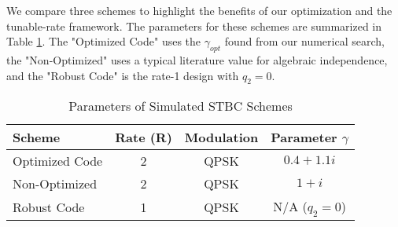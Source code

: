 \documentclass[twocolumn,conference]{IEEEtran}
\begin{document}
We compare three schemes to highlight the benefits of our optimization and the tunable-rate framework. The parameters for these schemes are summarized in Table \ref{tab:params}. The "Optimized Code" uses the \(\gamma_{opt}\) found from our numerical search, the "Non-Optimized" uses a typical literature value for algebraic independence, and the "Robust Code" is the rate-1 design with \(q_2 = 0\).

\begin{table}[h]
\caption{Parameters of Simulated STBC Schemes}
\label{tab:params}
\centering
\begin{tabular}{|l|c|c|c|}
\hline
\textbf{Scheme} & \textbf{Rate (R)} & \textbf{Modulation} & \textbf{Parameter \(\gamma\)} \\
\hline
Optimized Code & 2 & QPSK & \(0.4 + 1.1i\) \\
Non-Optimized & 2 & QPSK & \(1 + i\) \\
Robust Code & 1 & QPSK & N/A (\(q_2=0\)) \\
\hline
\end{tabular}
\end{table}
\end{document}
